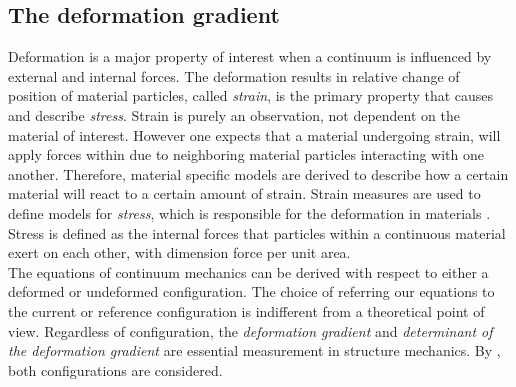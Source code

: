 \begin{appendices}
\chapter{The deformation gradient}
\label{appendix:defgrad}
Deformation is a major property of interest when a continuum is influenced by external and internal forces.  The deformation results in relative change of position of material particles, called \textit{strain}, is the primary property that causes and describe \textit{stress}. Strain is purely an observation, not dependent on the material of interest. However one expects that a material undergoing strain, will apply forces within due to neighboring material particles interacting with one another. Therefore, material specific models are derived to describe how a certain material will react to a certain amount of strain. Strain measures are used to define models for \textit{stress}, which is responsible for the deformation in materials \cite{Holzapfel2000}. Stress is defined as the internal forces that particles within a continuous material exert on each other, with dimension force per unit area.  \\
The equations of continuum mechanics can be derived with respect to either a deformed or undeformed configuration. The choice of referring our equations to the current or reference configuration is indifferent from a theoretical point of view. Regardless of configuration, the \textit{deformation gradient} and \textit{determinant of the deformation gradient} are essential measurement in structure mechanics. 
By \cite{Richter2016}, both configurations are considered.

\end{appendices}
